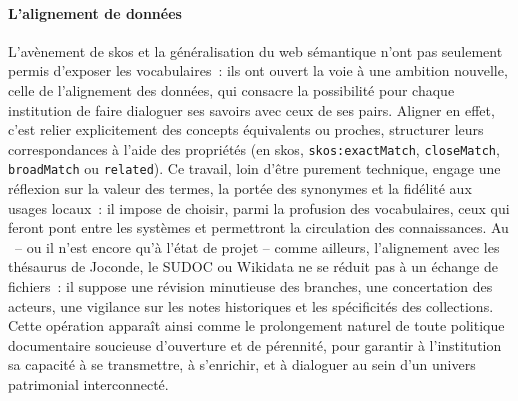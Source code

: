 \paragraph*{L'alignement de données}
L’avènement de \gls{skos} et la généralisation du web sémantique n’ont pas seulement permis d’exposer les vocabulaires~: ils ont ouvert la voie à une ambition nouvelle, celle de l’alignement des données, qui consacre la possibilité pour chaque institution de faire dialoguer ses savoirs avec ceux de ses pairs. Aligner en effet, c'est relier explicitement des concepts équivalents ou proches, structurer leurs correspondances à l’aide des propriétés (en \ac{skos}, \lstinline|skos:exactMatch|, \lstinline|closeMatch|, \lstinline|broadMatch| ou \lstinline|related|). Ce travail, loin d’être purement technique, engage une réflexion sur la valeur des termes, la portée des synonymes et la fidélité aux usages locaux~: il impose de choisir, parmi la profusion des vocabulaires, ceux qui feront pont entre les systèmes et permettront la circulation des connaissances. Au \mae~-- ou il n'est encore qu'à l'état de projet -- comme ailleurs, l’alignement avec les thésaurus de Joconde, le SUDOC ou Wikidata ne se réduit pas à un échange de fichiers~: il suppose une révision minutieuse des branches, une concertation des acteurs, une vigilance sur les notes historiques et les spécificités des collections. Cette opération apparaît ainsi comme le prolongement naturel de toute politique documentaire soucieuse d’ouverture et de pérennité, pour garantir à l'institution sa capacité à se transmettre, à s’enrichir, et à dialoguer au sein d’un univers patrimonial interconnecté.